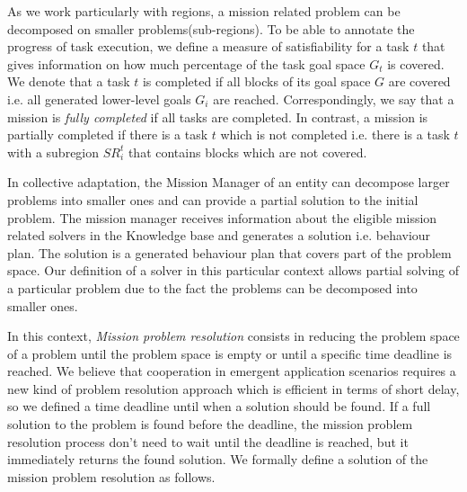 \documentclass[journal]{IEEEtran}
\theoremstyle{definition}
\newcommand\darko[1]{\nb{Darko}{#1}}
\begin{document}

As we work particularly with regions, a mission related problem can be decomposed on smaller problems(sub-regions). 
To be able to annotate the progress of task execution, we define a measure of satisfiability for a task $t$ that gives information on how much percentage of the task goal space $G_t$ is covered. %
We denote that a task $t$ is completed if all blocks of its goal space $G$ are covered i.e. all generated lower-level goals $G_i$ are reached. Correspondingly, we  say  that  a  mission is \textit{fully completed} if all tasks are completed. 
In contrast, a mission is partially completed if there is a task $t$ which is not completed i.e. there is a task $t$ with a subregion $SR^t_i$ that contains blocks which are not covered.



In collective adaptation, the Mission Manager of an entity can decompose larger problems into smaller ones and can provide a partial solution to the initial problem. 
The mission manager receives information about the eligible mission related solvers in the Knowledge base and generates a solution i.e. behaviour plan. The solution is a generated behaviour plan that covers part of the problem space.
Our definition of a solver in this particular context allows partial solving of a particular problem due to the fact the problems can be decomposed into smaller ones. 


In this context, \textit{Mission problem resolution} consists in reducing the problem space of a problem until the problem space is empty or until a specific time deadline is reached. We believe that cooperation in emergent application scenarios requires a new kind of problem resolution approach which is efficient in terms of short delay, so we defined a time deadline until when a solution should be found. If a full solution to the problem is found before the deadline, the mission problem resolution process don't need to wait until the deadline is reached, but it immediately returns the found solution.
We formally define a solution of the mission problem resolution as follows.
\end{document}
